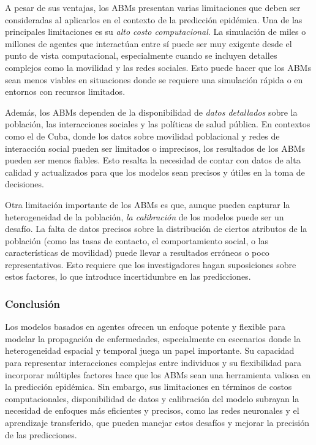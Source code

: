 A pesar de sus ventajas, los ABMs presentan varias limitaciones que deben ser consideradas al aplicarlos en el contexto de la predicción epidémica. Una de las principales limitaciones es su \textit{alto costo computacional}. La simulación de miles o millones de agentes que interactúan entre sí puede ser muy exigente desde el punto de vista computacional, especialmente cuando se incluyen detalles complejos como la movilidad y las redes sociales. Esto puede hacer que los ABMs sean menos viables en situaciones donde se requiere una simulación rápida o en entornos con recursos limitados\parencite{Nowzari2016ComplexNetworks}.

Además, los ABMs dependen de la disponibilidad de \textit{datos detallados} sobre la población, las interacciones sociales y las políticas de salud pública. En contextos como el de Cuba, donde los datos sobre movilidad poblacional y redes de interacción social pueden ser limitados o imprecisos, los resultados de los ABMs pueden ser menos fiables. Esto resalta la necesidad de contar con datos de alta calidad y actualizados para que los modelos sean precisos y útiles en la toma de decisiones\parencite{Rodriguez2022DataCentric}.

Otra limitación importante de los ABMs es que, aunque pueden capturar la heterogeneidad de la población, \textit{la calibración} de los modelos puede ser un desafío. La falta de datos precisos sobre la distribución de ciertos atributos de la población (como las tasas de contacto, el comportamiento social, o las características de movilidad) puede llevar a resultados erróneos o poco representativos. Esto requiere que los investigadores hagan suposiciones sobre estos factores, lo que introduce incertidumbre en las predicciones\parencite{Mata2021MathematicalEpidemics}.

\subsubsection{Conclusión}

Los modelos basados en agentes ofrecen un enfoque potente y flexible para modelar la propagación de enfermedades, especialmente en escenarios donde la heterogeneidad espacial y temporal juega un papel importante. Su capacidad para representar interacciones complejas entre individuos y su flexibilidad para incorporar múltiples factores hace que los ABMs sean una herramienta valiosa en la predicción epidémica. Sin embargo, sus limitaciones en términos de costos computacionales, disponibilidad de datos y calibración del modelo subrayan la necesidad de enfoques más eficientes y precisos, como las redes neuronales y el aprendizaje transferido, que pueden manejar estos desafíos y mejorar la precisión de las predicciones\parencite{Shinde2020ForecastingCOVID}.

